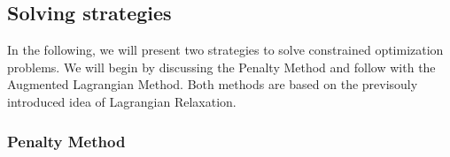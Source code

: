 
\subsection{Solving strategies}
In the following, we will present two strategies to solve constrained optimization problems. We will begin by discussing the Penalty Method and follow with the Augmented Lagrangian Method. Both methods are based on the previsouly introduced idea of Lagrangian Relaxation.
\subsubsection{Penalty Method}


\clearpage

